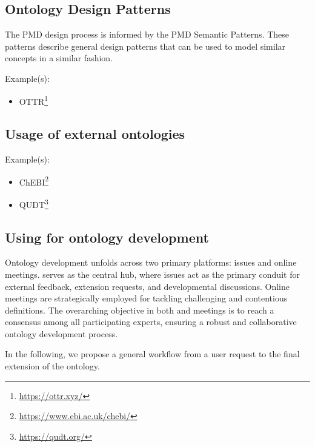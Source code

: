 \subsection{Ontology Design Patterns}

The PMD design process is informed by the PMD Semantic Patterns. These patterns describe general design patterns that can be used to model similar concepts in a similar fashion. 

Example(s): 
\begin{itemize}
    \item OTTR\footnote{\url{https://ottr.xyz/}}
\end{itemize}

\subsection{Usage of external ontologies}

Example(s): 
\begin{itemize}
    \item ChEBI\footnote{\url{https://www.ebi.ac.uk/chebi/}}
    \item QUDT\footnote{\url{https://qudt.org/}}
\end{itemize}

\subsection{Using {\github}  for ontology development}

Ontology development unfolds across two primary platforms: {\github} issues and online meetings. {\github}  serves as the central hub, where issues act as the primary conduit for external feedback, extension requests, and developmental discussions. Online meetings are strategically employed for tackling challenging and contentious definitions. The overarching objective in both {\github}  and meetings is to reach a consensus among all participating experts, ensuring a robust and collaborative ontology development process.

In the following, we propose a general workflow from a user request to the final extension of the ontology.


